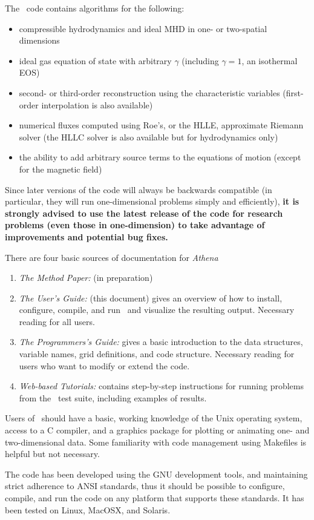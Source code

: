 The \ath\ code contains algorithms for
the following:
\begin{itemize}
\item compressible hydrodynamics and ideal MHD in one- or two-spatial dimensions
\item ideal gas equation of state with arbitrary $\gamma$ (including 
$\gamma = 1$, an isothermal EOS)
\item second- or third-order reconstruction using the characteristic variables
(first-order interpolation is also available)
\item numerical fluxes computed using Roe's, or the HLLE, approximate Riemann
solver (the HLLC solver is also available but for hydrodynamics only)
\item the ability to add arbitrary source terms to the equations of motion
(except for the magnetic field)
\end{itemize}
Since later versions of the code will always be backwards compatible
(in particular, they will run one-dimensional problems simply and
efficiently), {\bf it is strongly advised to use the latest release of
the code for research problems (even those in one-dimension) to take
advantage of improvements and potential bug fixes.}

There are four basic sources of documentation for {\it Athena}
\begin{enumerate}
\item {\it The Method Paper:} (in preparation)
\item {\it The User's Guide:} (this document) gives an overview of how to
install, configure, compile, and run \ath\ and visualize the resulting output.
Necessary reading for all users.
\item {\it The Programmers's Guide:} gives a basic introduction to the 
data structures, variable names, grid definitions, and code structure.
Necessary reading for users who want to modify or extend the code.
\item {\it Web-based Tutorials:} contains step-by-step instructions
for running problems from the \ath\ test suite, including examples of results.
\end{enumerate}

Users of \ath\ should have a basic, working knowledge of the Unix
operating system, access to a C compiler, and a graphics package for
plotting or animating one- and two-dimensional data.  Some familiarity
with code management using Makefiles is helpful but not necessary.

The code has been developed using the GNU development tools, and
maintaining strict adherence to ANSI standards, thus it should be possible
to configure, compile, and run the code on any platform that supports these
standards.  It has been tested on Linux, MacOSX, and Solaris.

